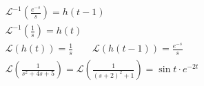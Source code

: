 \documentclass[11pt,a4paper,titlepage,draft]{article}
\begin{document}
\begin{gather*}
\mathscr{L}^{-1} \left(
\frac{e^{-s}}{s}\right)=h(t-1)\\
\mathscr{L}^{-1}\left(\frac{1}{s}\right) = h(t)\\
\mathscr{L}\left(
h(t)
\right) = \frac{1}{s}\qquad
\mathscr{L}\left(
h(t-1)
\right)=\frac{e^{-s}}{s}\\
\mathscr{L}\left(
\frac{1}{s^2+4s+5}
\right) = \mathscr{L}\left(
\frac{1}{(s+2)^2+1}
\right)=\sin t \cdot e^{-2t}
\end{gather*}
\end{document}
